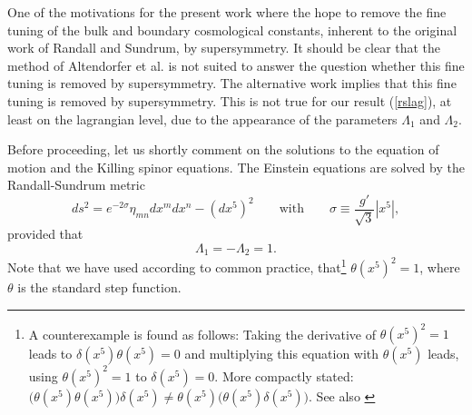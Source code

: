 \documentclass[a4paper,12pt, twoside]{article}
\numberwithin{equation}{section}
\begin{document}
One of the motivations for the present work where the hope to remove 
the fine tuning of the bulk and boundary cosmological constants, inherent 
to the original work of Randall and Sundrum, by supersymmetry. It 
should be clear that the method of Altendorfer et al. 
\cite{Altendorfer:2000rr} is not suited to answer the question whether this fine tuning is 
removed by supersymmetry. The alternative work \cite{Falkowski:2000er} 
implies that this fine tuning is removed by supersymmetry. This is not 
true for our result (\ref{rslag}), at least on the lagrangian level, due 
to the appearance of the parameters $\Lambda_1$ and $\Lambda_2$.

\medskip

Before proceeding, let us shortly comment on the solutions to the 
equation of motion and the Killing spinor equations. The Einstein equations 
are solved by the Randall-Sundrum metric
\begin{equation}
ds^2 = e^{-2\sigma}\eta_{mn}dx^mdx^n-(d{x^5})^2\qquad  \mbox{with} 
\qquad\sigma\equiv \frac{g'}{\sqrt{3}}|x^5|,\label{rsmetric}
\end{equation}
provided that 
\begin{equation}
\Lambda_1=-\Lambda_2=1.\label{val2}
\end{equation}
Note that we have used according to common practice, that\footnote{A 
counterexample is found as follows: Taking the derivative of 
$\theta(x^5)^2=1$ leads to $\delta(x^5)\theta(x^5)=0$ and multiplying this equation 
with $\theta(x^5)$ leads, using $\theta(x^5)^2=1$ to $\delta(x^5)=0$. 
More compactly stated: 
$\big(\theta(x^5)\theta(x^5)\big)\delta(x^5)\neq\theta(x^5)\big(\theta(x^5)\delta(x^5)\big)$. See also 
\cite{Conrad:1998ww}} $\theta(x^5)^2=1$, where $\theta$ is the standard step function.
\end{document}
